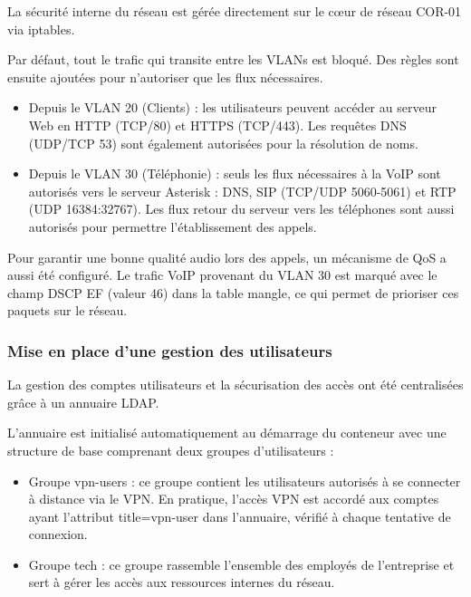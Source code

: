 La sécurité interne du réseau est gérée directement sur le cœur de réseau COR-01 via iptables.

Par défaut, tout le trafic qui transite entre les VLANs est bloqué. Des règles sont ensuite ajoutées pour n'autoriser que les flux nécessaires.\\

\begin{itemize}
    \item Depuis le VLAN 20 (Clients) : les utilisateurs peuvent accéder au serveur Web en HTTP (TCP/80) et HTTPS (TCP/443). Les requêtes DNS (UDP/TCP 53) sont également autorisées pour la résolution de noms.
    \item Depuis le VLAN 30 (Téléphonie) : seuls les flux nécessaires à la VoIP sont autorisés vers le serveur Asterisk : DNS, SIP (TCP/UDP 5060-5061) et RTP (UDP 16384:32767). Les flux retour du serveur vers les téléphones sont aussi autorisés pour permettre l'établissement des appels.\\
\end{itemize}

\newpage
Pour garantir une bonne qualité audio lors des appels, un mécanisme de QoS a aussi été configuré. Le trafic VoIP provenant du VLAN 30 est marqué avec le champ DSCP EF (valeur 46) dans la table mangle, ce qui permet de prioriser ces paquets sur le réseau.

\subsubsection{Mise en place d'une gestion des utilisateurs}

La gestion des comptes utilisateurs et la sécurisation des accès ont été centralisées grâce à un annuaire LDAP.

L'annuaire est initialisé automatiquement au démarrage du conteneur avec une structure de base comprenant deux groupes d'utilisateurs :

\begin{itemize}
    \item Groupe vpn-users : ce groupe contient les utilisateurs autorisés à se connecter à distance via le VPN. En pratique, l'accès VPN est accordé aux comptes ayant l'attribut title=vpn-user dans l'annuaire, vérifié à chaque tentative de connexion.
    \item Groupe tech : ce groupe rassemble l'ensemble des employés de l'entreprise et sert à gérer les accès aux ressources internes du réseau.
\end{itemize}

